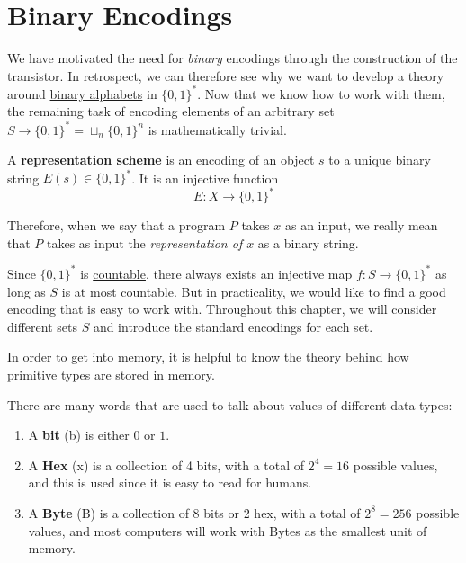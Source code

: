 \section{Binary Encodings} 
  
  We have motivated the need for \textit{binary} encodings through the construction of the transistor. In retrospect, we can therefore see why we want to develop a theory around \hyperref[th-binary_motivation]{binary alphabets} in $\{0, 1\}^\ast$. Now that we know how to work with them, the remaining task of encoding elements of an arbitrary set $S \to \{0, 1\}^\ast = \sqcup_n \{0, 1\}^n$ is mathematically trivial. 

  \begin{definition}
    A \textbf{representation scheme} is an encoding of an object $s$ to a unique binary string $E(s) \in \{0,1\}^\ast$. It is an injective function 
    \begin{equation}
      E: X \longrightarrow \{0,1\}^\ast
    \end{equation}
  \end{definition}

  Therefore, when we say that a program $P$ takes $x$ as an input, we really mean that $P$ takes as input the \textit{representation of $x$} as a binary string.  

  Since $\{0, 1\}^\ast$ is \hyperref[set-def:countable]{countable}, there always exists an injective map $f: S \to \{0, 1\}^\ast$ as long as $S$ is at most countable. But in practicality, we would like to find a good encoding that is easy to work with. Throughout this chapter, we will consider different sets $S$ and introduce the standard encodings for each set. 

  In order to get into memory, it is helpful to know the theory behind how primitive types are stored in memory.  

  \begin{definition}
    There are many words that are used to talk about values of different data types: 
    \begin{enumerate}
      \item A \textbf{bit} (b) is either $0$ or $1$. 
      \item A \textbf{Hex} (x) is a collection of 4 bits, with a total of $2^4 = 16$ possible values, and this is used since it is easy to read for humans. 
      \item A \textbf{Byte} (B) is a collection of 8 bits or 2 hex, with a total of $2^8 = 256$ possible values, and most computers will work with Bytes as the smallest unit of memory. 
    \end{enumerate}
  \end{definition}

